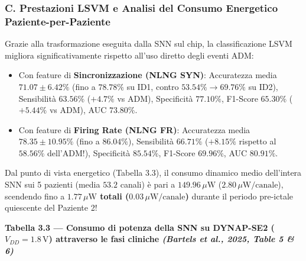 \documentclass[11pt,a4paper]{article}
\begin{document}
\subsubsection{C. Prestazioni LSVM e Analisi del Consumo Energetico Paziente-per-Paziente}
Grazie alla trasformazione eseguita dalla SNN sul chip, la classificazione LSVM migliora significativamente rispetto all'uso diretto degli eventi ADM:
\begin{itemize}
  \item Con feature di \textbf{Sincronizzazione (NLNG SYN)}: Accuratezza media \textbf{$71.07 \pm 6.42\%$} (fino a $78.78\%$ su ID1, contro $53.54\% \to 69.76\%$ su ID2), Sensibilità \textbf{$63.56\%$} ($+4.7\%$ vs ADM), Specificità \textbf{$77.10\%$}, F1-Score \textbf{$65.30\%$} ($+5.44\%$ vs ADM), AUC \textbf{$73.80\%$}.
  \item Con feature di \textbf{Firing Rate (NLNG FR)}: Accuratezza media \textbf{$78.35 \pm 10.95\%$} (fino a $86.04\%$), Sensibilità \textbf{$66.71\%$} ($+8.15\%$ rispetto al $58.56\%$ dell'ADM!), Specificità \textbf{$85.54\%$}, F1-Score \textbf{$69.96\%$}, AUC \textbf{$80.91\%$}.
\end{itemize}

Dal punto di vista energetico (Tabella 3.3), il consumo dinamico medio dell'intera SNN sui 5 pazienti (media $53.2$ canali) è pari a \textbf{$149.96\,\mu\text{W}$} (\textbf{$2.80\,\mu\text{W/canale}$}), scendendo fino a \textbf{$1.77\,\mu\text{W}$ totali ($0.03\,\mu\text{W/canale}$)} durante il periodo pre-ictale quiescente del Paziente 2!

\textbf{Tabella 3.3 --- Consumo di potenza della SNN su DYNAP-SE2 ($V_{DD}=1.8\,\text{V}$) attraverso le fasi cliniche \textit{(Bartels et al., 2025, Table 5 \& 6)}}
\end{document}
